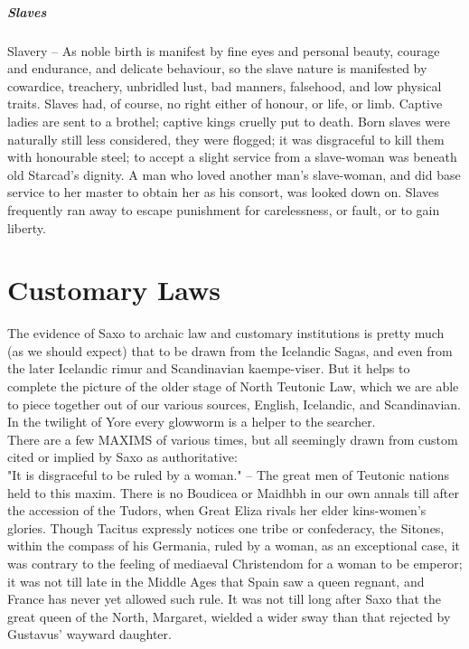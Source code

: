 \documentclass[10pt,a4paper]{report}
\begin{document}
\paragraph*{Slaves}
Slavery -- As noble birth is manifest by fine eyes and personal beauty, courage and endurance, and delicate behaviour, so the slave nature is manifested by cowardice, treachery, unbridled lust, bad manners, falsehood, and low physical traits. Slaves had, of course, no right either of honour, or life, or limb. Captive ladies are sent to a brothel; captive kings cruelly put to death. Born slaves were naturally still less considered, they were flogged; it was disgraceful to kill them with honourable steel; to accept a slight service from a slave-woman was beneath old Starcad's dignity. A man who loved another man's slave-woman, and did base service to her master to obtain her as his consort, was looked down on. Slaves frequently ran away to escape punishment for carelessness, or fault, or to gain liberty.

\chapter{Customary Laws}
The evidence of Saxo to archaic law and customary institutions is pretty much (as we should expect) that to be drawn from the Icelandic Sagas, and even from the later Icelandic rimur and Scandinavian kaempe-viser. But it helps to complete the picture of the older stage of North Teutonic Law, which we are able to piece together out of our various sources, English, Icelandic, and Scandinavian. In the twilight of Yore every glowworm is a helper to the searcher.\\

There are a few MAXIMS of various times, but all seemingly drawn from custom cited or implied by Saxo as authoritative:\\

"It is disgraceful to be ruled by a woman." -- The great men of Teutonic nations held to this maxim. There is no Boudicea or Maidhbh in our own annals till after the accession of the Tudors, when Great Eliza rivals her elder kins-women's glories. Though Tacitus expressly notices one tribe or confederacy, the Sitones, within the compass of his Germania, ruled by a woman, as an exceptional case, it was contrary to the feeling of mediaeval Christendom for a woman to be emperor; it was not till late in the Middle Ages that Spain saw a queen regnant, and France has never yet allowed such rule. It was not till long after Saxo that the great queen of the North, Margaret, wielded a wider sway than that rejected by Gustavus' wayward daughter.\\
\end{document}
